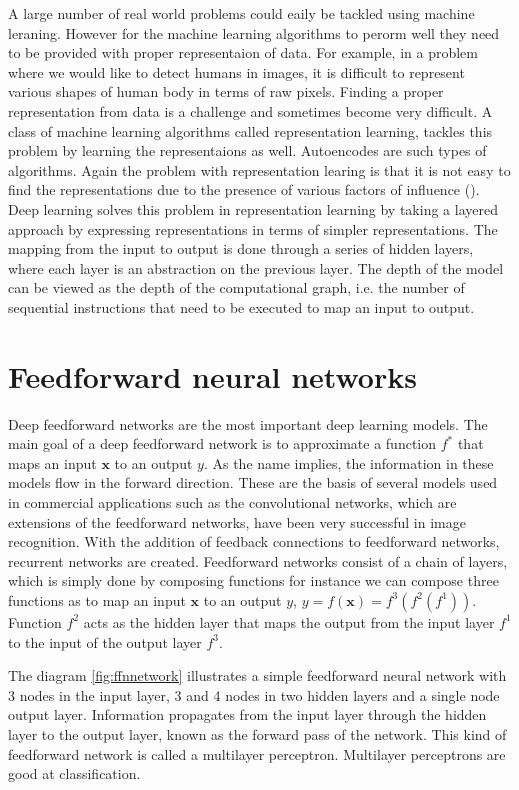 A large number of real world problems could eaily be tackled using machine leraning. However for
the machine learning algorithms to perorm well they need to be provided with proper representaion
of data. For example, in a problem where we would like to detect humans in images, it is
difficult to represent various shapes of human body in terms of raw pixels. Finding a proper
representation from data is a challenge and sometimes become very difficult. A class of machine
learning algorithms called representation learning, tackles this problem by learning the
representaions as well. Autoencodes are such types of algorithms. Again the problem with
representation learing is that it is not easy to find the representations due to the presence of
various factors of influence (\citet{bengio2015deep}). Deep learning solves this problem in
representation learning by taking a layered approach by expressing representations in terms of
simpler representations. The mapping from the input to output is done through a series of hidden
layers, where each layer is an abstraction on the previous layer. The depth of the model can be
viewed as the depth of the computational graph, i.e. the number of sequential instructions that
need to be executed to map an input to output.

\section{Feedforward neural networks}
Deep feedforward networks are the most important deep learning models. The main goal of a deep
feedforward network is to approximate a function $f^{*}$ that maps an input $\textbf{x}$ to an
output $y$. As the name implies, the information in these models flow in the forward direction.
These are the basis of several models used in commercial applications such as the convolutional
networks, which are extensions of the feedforward networks, have been very successful in image
recognition. With the addition of feedback connections to feedforward networks, recurrent
networks are created. Feedforward networks consist of a chain of layers, which is simply done by
composing functions for instance we can compose three functions as to map an input $\textbf{x}$
to an output $y$, $y = f(\textbf{x}) = f^{3}(f^{2}(f^{1}))$. Function $f^{2}$ acts as the hidden
layer that maps the output from the input layer $f^{1}$ to the input of the output layer $f^{3}$.

The diagram \ref{fig:ffnnetwork} illustrates a simple feedforward neural network with 3 nodes in
the input layer, 3 and 4 nodes in two hidden layers and a single node output layer. Information
propagates from the input layer through the hidden layer to the output layer, known as the
forward pass of the network. This kind of feedforward network is called a multilayer perceptron.
Multilayer perceptrons are good at classification.

